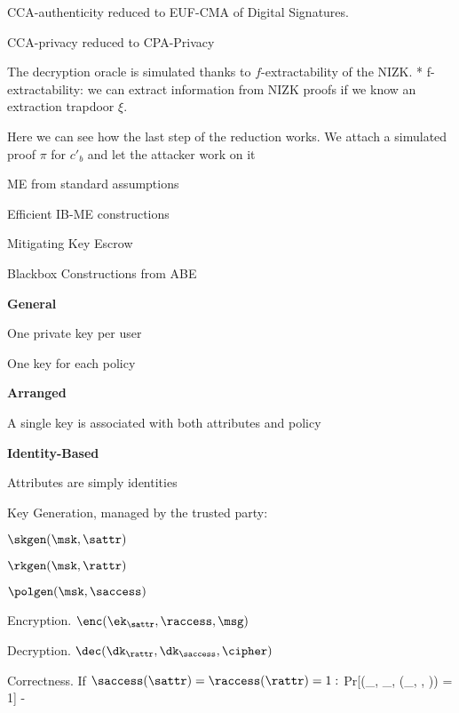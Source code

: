 \startslide[title={Showcase: CCA Direct Transformation}]
\stopslide

\startslide[title={Sketch Proof}]
\startitemize[1, broad]
\item CCA-authenticity reduced to EUF-CMA of Digital Signatures.
\item CCA-privacy reduced to CPA-Privacy
\stopitemize
\stopslide

\startslide[title={CCA Privacy Reduction 1/2}]
The decryption oracle is simulated thanks to $f$-extractability of the NIZK.
\bigskip
{}
\bigskip
* f-extractability: we can extract information from NIZK proofs if we know an extraction trapdoor $\xi$.
\stopslide

\startslide[title={CCA Privacy Reduction 2/2}]
Here we can see how the last step of the reduction works.
We attach a simulated proof $\pi$ for $c'_b$ and let the attacker work on it
\bigskip
{}
\stopslide


\startslide[title={Open problems}]
\startitemize[1, broad]
\item ME from standard assumptions
\item Efficient IB-ME constructions
\item Mitigating Key Escrow
\item Blackbox Constructions from ABE
\stopitemize
\stopslide

\startslide
\stopslide

\startslide[title={Many types of ME}]
\startitemize[1, broad]
\item {\bf General}
\startitemize[packed]
\item One private key per user
\item One key for each policy
\stopitemize
\item {\bf Arranged}
\startitemize[packed]
\item A single key is associated with both attributes and policy
\stopitemize
\item {\bf Identity-Based}
\startitemize[packed]
\item Attributes are simply identities
\stopitemize
\stopitemize
\stopslide

\startslide[title={General Setting}]
\startitemize[1,broad]
\item Key Generation, managed by the trusted party:
\item $\skgen(\msk, \sattr)$
\item $\rkgen(\msk, \rattr)$
\item $\polgen(\msk, \saccess)$
\stopitemize
\item Encryption. $\enc(\ek_\sattr, \raccess, \msg)$
\item Decryption. $\dec(\dk_\rattr, \dk_\saccess, \cipher)$
\item Correctness. If $\saccess(\sattr) = \raccess(\rattr) = 1:$
\startformula
Pr[\dec(\dk_\rattr, \dk_\saccess, \enc(\ek_\sattr, \raccess, \msg)) = 1]  - \negl
\stopformula
\stopitemize
\stopslide

